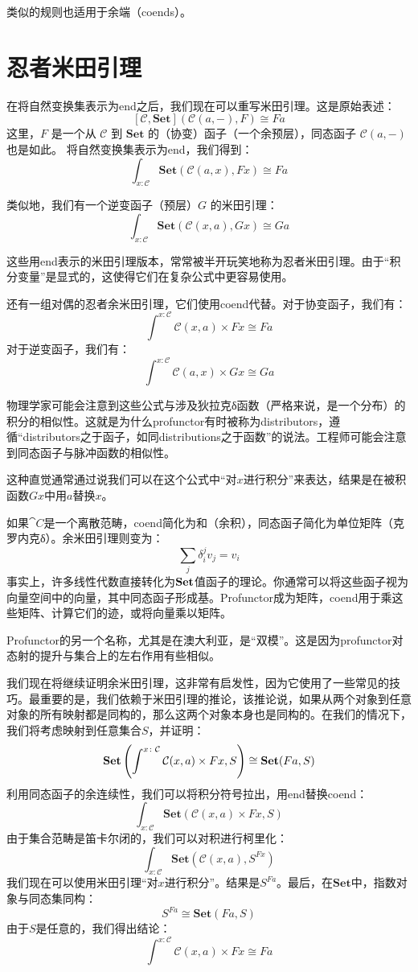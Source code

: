 \documentclass[DaoFP]{subfiles}
\begin{document}
类似的规则也适用于余端（coends）。

\section{忍者米田引理}

在将自然变换集表示为end之后，我们现在可以重写米田引理。这是原始表述：
\[ [\mathcal{C}, \mathbf{Set}]( \mathcal{C}(a, -), F) \cong F a \]
这里，$F$ 是一个从 $\mathcal{C}$ 到 $\mathbf{Set}$ 的（协变）函子（一个余预层），同态函子 $\mathcal{C}(a, -)$ 也是如此。
将自然变换集表示为end，我们得到：
\[ \int_{x \colon \mathcal{C}} \mathbf{Set} (\mathcal{C}(a, x), F x) \cong F a \]

类似地，我们有一个逆变函子（预层）$G$ 的米田引理：
\[ \int_{x \colon \mathcal{C}} \mathbf{Set} (\mathcal{C}(x, a), G x) \cong G a \]

这些用end表示的米田引理版本，常常被半开玩笑地称为忍者米田引理。由于“积分变量”是显式的，这使得它们在复杂公式中更容易使用。

还有一组对偶的忍者余米田引理，它们使用coend代替。对于协变函子，我们有：
\[ \int^{x \colon \mathcal{C}} \mathcal{C}(x, a) \times F x \cong F a \]
对于逆变函子，我们有：
\[ \int^{x \colon \mathcal{C}} \mathcal{C}(a, x) \times G x \cong G a \]

物理学家可能会注意到这些公式与涉及狄拉克δ函数（严格来说，是一个分布）的积分的相似性。这就是为什么profunctor有时被称为distributors，遵循“distributors之于函子，如同distributions之于函数”的说法。工程师可能会注意到同态函子与脉冲函数的相似性。

这种直觉通常通过说我们可以在这个公式中“对$x$进行积分”来表达，结果是在被积函数$G x$中用$a$替换$x$。

如果$\cat C$是一个离散范畴，coend简化为和（余积），同态函子简化为单位矩阵（克罗内克δ）。余米田引理则变为：
\[ \sum_j \delta_i^j v_j = v_i \]
事实上，许多线性代数直接转化为$\mathbf{Set}$值函子的理论。你通常可以将这些函子视为向量空间中的向量，其中同态函子形成基。Profunctor成为矩阵，coend用于乘这些矩阵、计算它们的迹，或将向量乘以矩阵。

Profunctor的另一个名称，尤其是在澳大利亚，是“双模”。这是因为profunctor对态射的提升与集合上的左右作用有些相似。

我们现在将继续证明余米田引理，这非常有启发性，因为它使用了一些常见的技巧。最重要的是，我们依赖于米田引理的推论，该推论说，如果从两个对象到任意对象的所有映射都是同构的，那么这两个对象本身也是同构的。在我们的情况下，我们将考虑映射到任意集合$S$，并证明：
\[ \mathbf{Set} \left(\int^{x \colon \mathcal{C}} \mathcal{C}(x, a) \times F x, S \right) \cong 
    \mathbf{Set} (F a, S)\]
利用同态函子的余连续性，我们可以将积分符号拉出，用end替换coend：
\[ \int_{x \colon \mathcal{C}} \mathbf{Set} \left( \mathcal{C}(x, a) \times F x, S \right) \]
由于集合范畴是笛卡尔闭的，我们可以对积进行柯里化：
\[ \int_{x \colon \mathcal{C}} \mathbf{Set} \left( \mathcal{C}(x, a) , S^{F x} \right) \]
我们现在可以使用米田引理“对$x$进行积分”。结果是$S^{F a}$。最后，在$\mathbf{Set}$中，指数对象与同态集同构：
\[S^{F a} \cong \mathbf{Set}(F a, S)\]
由于$S$是任意的，我们得出结论：
\[ \int^{x \colon \mathcal{C}} \mathcal{C}(x, a) \times F x \cong F a \]
\end{document}
